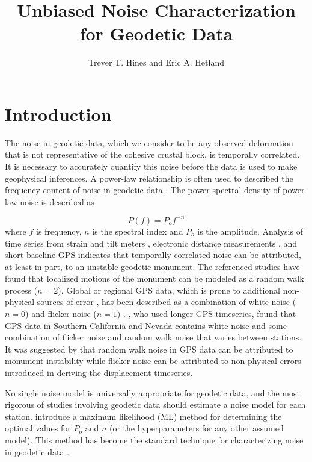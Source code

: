 \documentclass[10pt,a4paper]{article}
\title{Unbiased Noise Characterization for Geodetic Data}
\author{Trever T. Hines and Eric A. Hetland}
\begin{document}
\maketitle
\section{Introduction}\label{sec:Introduction}


The noise in geodetic data, which we consider to be any observed deformation that is not representative of the cohesive crustal block, is temporally correlated. It is necessary to accurately quantify this noise before the data is used to make geophysical inferences. A power-law relationship is often used to described the frequency content of noise in geodetic data \citep{Agnew1992}.  The power spectral density of power-law noise is described as 

\begin{equation}\label{eq.PowerLaw}
  P(f) = P_o f^{-n}
\end{equation}
where $f$ is frequency, $n$ is the spectral index and $P_o$ is the amplitude. Analysis of time series from strain and tilt meters \citep{Wyatt1982,Wyatt1989}, electronic distance measurements \citep{Langbein1997}, and short-baseline GPS \citep{King2009} indicates that temporally correlated noise can be attributed, at least in part, to an unstable geodetic monument. The referenced studies have found that localized motions of the monument can be modeled as a random walk process ($n=2$). Global or regional GPS data, which is prone to additional non-physical sources of error \citep[e.g.][]{King2010}, has been described as a combination of white noise ($n=0$) and flicker noise ($n=1$) \citep{Zhang1997,Mao1999,Williams2004}. \citet{Langbein2008}, who used longer GPS timeseries,  found that GPS data in Southern California and Nevada contains white noise and some combination of flicker noise and random walk noise that varies between stations. It was suggested by \citet{Langbein2008} that random walk noise in GPS data can be attributed to monument instability while flicker noise can be attributed to non-physical errors introduced in deriving the displacement timeseries.  

No single noise model is universally appropriate for geodetic data, and the most rigorous of studies involving geodetic data should estimate a noise model for each station.  \citet{Langbein1997} introduce a maximum likelihood (ML) method for determining the optimal values for $P_o$ and $n$ (or the hyperparameters for any other assumed model). This method has become the standard technique for characterizing noise in geodetic data \citep{Langbein2004,Langbein2008,Zhang1997,Mao1999,Williams2004,King2009,Murray2017}.  
\end{document}
